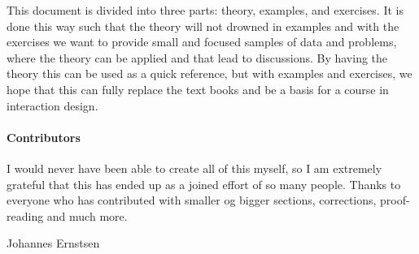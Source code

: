 This document is divided into three parts: theory, examples, and exercises. It is done this way such that the theory will not drowned in examples and with the exercises we want to provide small and focused samples of data and problems, where the theory can be applied and that lead to discussions. By having the theory this can be used as a quick reference, but with examples and exercises, we hope that this can fully replace the text books and be a basis for a course in interaction design.

\paragraph{Contributors}
I would never have been able to create all of this myself, so I am extremely grateful that this has ended up as a joined effort of so many people. Thanks to everyone who has contributed with smaller og bigger sections, corrections, proof-reading and much more.

\begin{multicols}{2}
  Johannes Ernstsen
\end{multicols}

